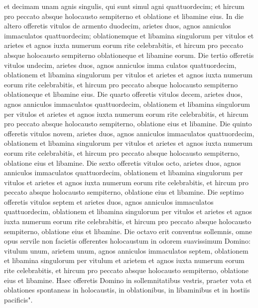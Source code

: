 \begin{biblechapter}
\verse et decimam unam agnis singulis, qui sunt simul agni quattuordecim; 
\verse et hircum pro peccato absque holocausto sempiterno et oblatione et libamine eius. 
\verse In die altero offeretis vitulos de armento duodecim, arietes duos, agnos anniculos immaculatos quattuordecim; 
\verse oblationemque et libamina singulorum per vitulos et arietes et agnos iuxta numerum eorum rite celebrabitis, 
\verse et hircum pro peccato absque holocausto sempiterno oblationeque et libamine eorum. 
\verse Die tertio offeretis vitulos undecim, arietes duos, agnos anniculos imma culatos quattuordecim, 
\verse oblationem et libamina singulorum per vitulos et arietes et agnos iuxta numerum eorum rite celebrabitis, 
\verse et hircum pro peccato absque holocausto sempiterno oblationeque et libamine eius. 
\verse Die quarto offeretis vitulos decem, arietes duos, agnos anniculos immaculatos quattuordecim, 
\verse oblationem et libamina singulorum per vitulos et arietes et agnos iuxta numerum eorum rite celebrabitis, 
\verse et hircum pro peccato absque holocausto sempiterno, oblatione eius et libamine. 
\verse Die quinto offeretis vitulos novem, arietes duos, agnos anniculos immaculatos quattuordecim, 
\verse oblationem et libamina singulorum per vitulos et arietes et agnos iuxta numerum eorum rite celebrabitis, 
\verse et hircum pro peccato absque holocausto sempiterno, oblatione eius et libamine. 
\verse Die sexto offeretis vitulos octo, arietes duos, agnos anniculos immaculatos quattuordecim, 
\verse oblationem et libamina singulorum per vitulos et arietes et agnos iuxta numerum eorum rite celebrabitis, 
\verse et hircum pro peccato absque holocausto sempiterno, oblatione eius et libamine. 
\verse Die septimo offeretis vitulos septem et arietes duos, agnos anniculos immaculatos quattuordecim, 
\verse oblationem et libamina singulorum per vitulos et arietes et agnos iuxta numerum eorum rite celebrabitis, 
\verse et hircum pro peccato absque holocausto sempiterno, oblatione eius et libamine. 
\verse Die octavo erit conventus sollemnis, omne opus servile non facietis 
\verse offerentes holocaustum in odorem suavissimum Domino: vitulum unum, arietem unum, agnos anniculos immaculatos septem, 
\verse oblationem et libamina singulorum per vitulum et arietem et agnos iuxta numerum eorum rite celebrabitis, 
\verse et hircum pro peccato absque holocausto sempiterno, oblatione eius et libamine. 
\verse Haec offeretis Domino in sollemnitatibus vestris, praeter vota et oblationes spontaneas in holocaustis, in oblationibus, in libaminibus et in hostiis pacificis". 
\end{biblechapter}

